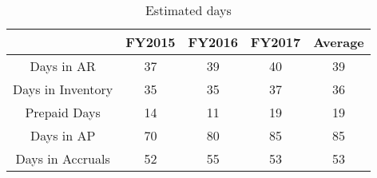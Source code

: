 \begin{table}[ht]
\centering
\begin{tabular}{@{}ccccc@{}}
\toprule
                  & FY2015 & FY2016 & FY2017 & Average \\ \midrule
Days in AR        & 37     & 39     & 40     & 39      \\
Days in Inventory & 35     & 35     & 37     & 36      \\
Prepaid Days      & 14     & 11     & 19     & 19      \\
Days in AP        & 70     & 80     & 85     & 85      \\
Days in Accruals  & 52     & 55     & 53     & 53      \\ \bottomrule
\end{tabular}
\caption{Estimated days}
\label{tab:part1-estimated days}
\end{table}
